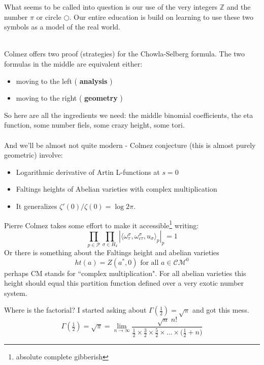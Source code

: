 \documentclass[12pt]{article}
\begin{document}
\noindent What seems to be called into question is our use of the very integers $\mathbb{Z}$ and the  number $\pi$ or circle $\bigcirc$.  Our entire education is build on learning to use these two symbols as a model of the real world. 
 \\
Colmez offers two proof (strategies) for the Chowla-Selberg formula.  The two formulas in the middle are equivalent either:
\begin{itemize}
\item moving to the left ( \textbf{analysis} )
\item moving to the right ( \textbf{geometry} )
\end{itemize}
So here are all the ingredients we need: the middle binomial coefficients, the eta function, some number fiels, some crazy height, some tori. \\ \\
And we'll be almost not quite modern - Colmez conjecture (this is almost purely geometric) involve:
\begin{itemize}
\item Logarithmic derivative of Artin L-functions at $s= 0$
\item Faltings heights of Abelian varieties with complex multiplication
\item It generalizes $\zeta'(0)/\zeta(0) = \log 2\pi$.
\end{itemize}
Pierre Colmez takes some effort to make it accessible\footnote{absolute complete gibberish} writing:
$$\prod_{p \in \mathcal{P}} \prod_{\sigma\in H_k} | \langle \omega_\tau^\sigma, \omega_{c\tau}^\sigma , u_\sigma \rangle_p |_p = 1 $$
Or there is something about the Faltings height and abelian varieties
$$ ht(a) = Z(a^\ast, 0) \text{ for all } a \in \mathcal{CM}^0 $$
perhaps CM stands for ``complex multiplication".  For all abelian varieties this height should equal this partition function defined over a very exotic number system.

\newpage

\noindent Where is the factorial?  I started asking about $\Gamma(\frac{1}{2}) = \sqrt{\pi}$ and got this mess.  
$$\Gamma(\tfrac{1}{2}) = \sqrt{\pi} = \lim_{n \to \infty}
\frac{ \sqrt{n} \;n!}{ \frac{1}{2} \times \frac{3}{2} \times \frac{5}{2} \times \dots \times \big(\frac{1}{2}+n\big)} $$

\newpage

\selectfont \fontsize{12}{10}\selectfont
\end{document}
